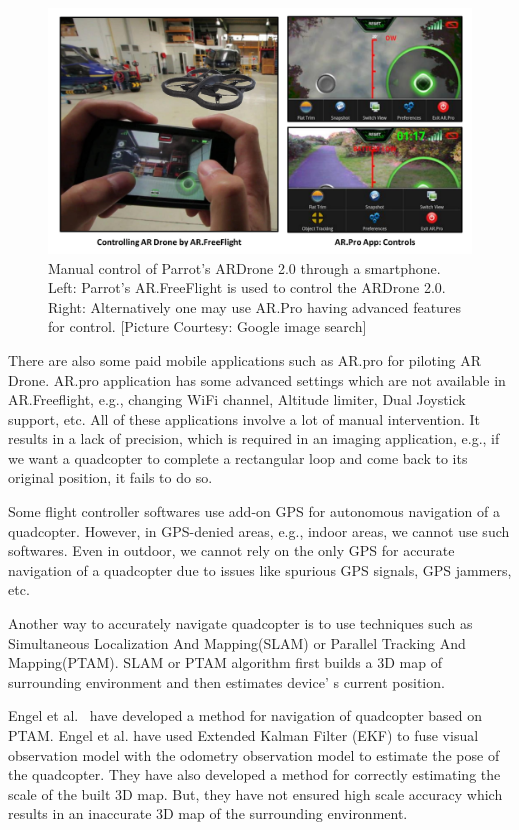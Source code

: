 \begin{figure}[h!]
  \includegraphics[width=\textwidth]{figures/manualControl}
   \caption[Manual control of Parrot's ARDrone 2.0]{Manual control of Parrot's
  ARDrone 2.0 through a smartphone. Left: Parrot's AR.FreeFlight is used to
  control the ARDrone 2.0. 
  Right: Alternatively one may use AR.Pro having advanced features for control.
  [Picture Courtesy: Google image search]}
   \label{fig:manualControl}
\end{figure}

There are also some paid mobile applications such as AR.pro for piloting AR
Drone. AR.pro application has some advanced settings which are not available in
AR.Freeflight, e.g., changing WiFi channel, Altitude limiter, Dual Joystick support, etc. All of
these applications involve a lot of manual intervention.  It results in a lack of
precision, which is required in an imaging application, e.g., if we want a
quadcopter to complete a rectangular loop and come back to its original
position, it fails to do so.

Some flight controller softwares use add-on GPS for autonomous navigation of
a quadcopter. However, in GPS-denied areas, e.g., indoor areas, we cannot use such
softwares. Even in outdoor, we cannot rely on the only GPS for accurate
navigation of a quadcopter due to issues like spurious GPS signals, GPS jammers,
etc.

Another way to accurately navigate quadcopter is to use techniques such as
Simultaneous Localization And Mapping(SLAM)\cite{Davison:2007} or Parallel Tracking And
Mapping(PTAM)\cite{klein}. SLAM or PTAM algorithm first builds a 3D map of
surrounding environment and then estimates device'	s current position.

Engel et al.~\cite{Engel12} have developed a method for navigation of quadcopter
based on PTAM\cite{klein}. Engel et al. have used Extended Kalman Filter (EKF)
to fuse visual observation model with the odometry observation model to estimate
the pose of the quadcopter. They have also developed a method for
correctly estimating the scale of the built 3D map. But, they have not ensured
high scale accuracy which results in an inaccurate 3D map of
the surrounding environment.

